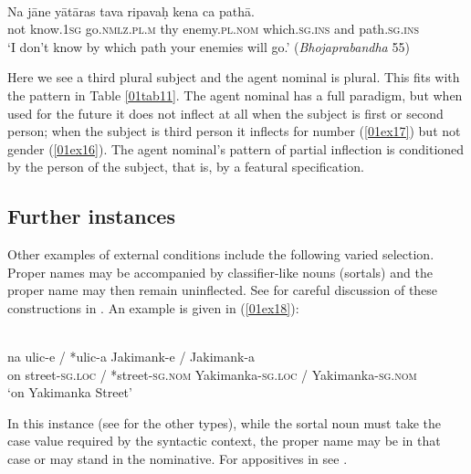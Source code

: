 \documentclass[output=paper,colorlinks,citecolor=brown]{langscibook}
\begin{document}
\begin{exe}
	\ex {} \citep[114]{stump2013} \label{01ex17} \\
	\gll Na	jāne	yātāras	tava	ripavaḥ	kena	ca	pathā. \\
	not	know.\textsc{1sg}	go.\textsc{nmlz.pl.m}	thy	enemy.\textsc{pl.nom}	which.\textsc{sg.ins}	and	path.\textsc{sg.ins} \\
	\trans ‘I don’t know by which path your enemies will go.’ \hfill (\textit{Bhojaprabandha} 55)
\end{exe}

Here we see a third plural subject and the agent nominal is plural. This fits with the pattern in Table \ref{01tab11}. The agent nominal has a full paradigm, but when used for the future it does not inflect at all when the subject is first or second person; when the subject is third person it inflects for number (\ref{01ex17}) but not gender (\ref{01ex16}). The agent nominal's pattern of partial inflection is conditioned by the person of the subject, that is, by a featural specification.

\subsection{Further instances} \label{01sec5.4}

Other examples of external conditions include the following varied selection. Proper names may be accompanied by classifier-like nouns (sortals) and the proper name may then remain uninflected. See \citet{matushansky2022, matushansky2023} for careful discussion of these constructions in . An example is given in (\ref{01ex18}):

\begin{exe}
	\ex {} \citep[235]{matushansky2023} \label{01ex18} \\
	\gll na	ulic-e / *ulic-a \phantom{xxxxxxxxxxxxxxxxxx} Jakimank-e / Jakimank-a \\
	on	street-\textsc{sg.loc} / *street-\textsc{sg.nom} \phantom{xxxxxxxxxxxxxxxxxx} Yakimanka-\textsc{sg.loc} / Yakimanka-\textsc{sg.nom}  \\
	\trans ‘on Yakimanka Street’
\end{exe}

In this instance (see \citealt{matushansky2023} for the other types), while the sortal noun must take the case value required by the syntactic context, the proper name may be in that case or may stand in the nominative. For appositives in  see \citet{cetnarowska2021}.
\end{document}
